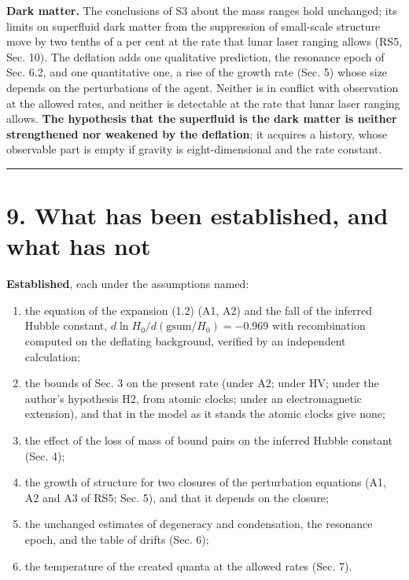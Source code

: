 \documentclass[
  10pt,
]{article}
\providecommand{\tightlist}{%
  \setlength{\itemsep}{0pt}\setlength{\parskip}{0pt}}
\begin{document}
\textbf{Dark matter.} The conclusions of S3 about the mass ranges hold
unchanged; its limits on superfluid dark matter from the suppression of
small-scale structure move by two tenths of a per cent at the rate that
lunar laser ranging allows (RS5, Sec. 10). The deflation adds one
qualitative prediction, the resonance epoch of Sec. 6.2, and one
quantitative one, a rise of the growth rate (Sec. 5) whose size depends
on the perturbations of the agent. Neither is in conflict with
observation at the allowed rates, and neither is detectable at the rate
that lunar laser ranging allows. \textbf{The hypothesis that the
superfluid is the dark matter is neither strengthened nor weakened by
the deflation}; it acquires a history, whose observable part is empty if
gravity is eight-dimensional and the rate constant.

\begin{center}\rule{0.5\linewidth}{0.5pt}\end{center}

\hypertarget{what-has-been-established-and-what-has-not}{%
\section{9. What has been established, and what has
not}\label{what-has-been-established-and-what-has-not}}

\textbf{Established}, each under the assumptions named:

\begin{enumerate}
\def\labelenumi{\arabic{enumi}.}
\tightlist
\item
  the equation of the expansion (1.2) (A1, A2) and the fall of the
  inferred Hubble constant, \(d\ln H_0/d(\mathrm{gsum}/H_0)=-0.969\)
  with recombination computed on the deflating background, verified by
  an independent calculation;
\item
  the bounds of Sec. 3 on the present rate (under A2; under HV; under
  the author's hypothesis H2, from atomic clocks; under an
  electromagnetic extension), and that in the model as it stands the
  atomic clocks give none;
\item
  the effect of the loss of mass of bound pairs on the inferred Hubble
  constant (Sec. 4);
\item
  the growth of structure for two closures of the perturbation equations
  (A1, A2 and A3 of RS5; Sec. 5), and that it depends on the closure;
\item
  the unchanged estimates of degeneracy and condensation, the resonance
  epoch, and the table of drifts (Sec. 6);
\item
  the temperature of the created quanta at the allowed rates (Sec. 7).
\end{enumerate}
\end{document}
